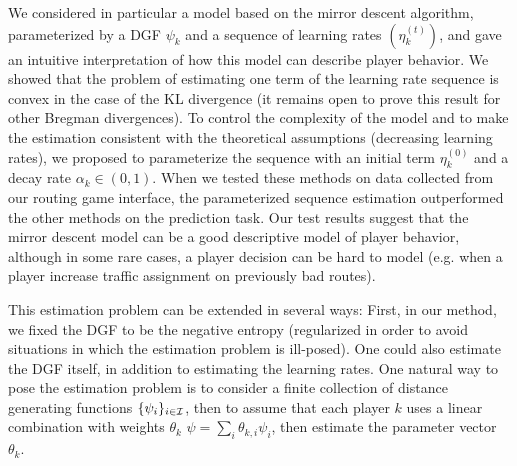 \documentclass{sig-alternate-ipsn13}
\begin{document}
We considered in particular a model based on the mirror descent algorithm, parameterized by a DGF $\psi_k$ and a sequence of learning rates $(\eta^{(t)}_k)$, and gave an intuitive interpretation of how this model can describe player behavior. We showed that the problem of estimating one term of the learning rate sequence is convex in the case of the KL divergence (it remains open to prove this result for other Bregman divergences). To control the complexity of the model and to make the estimation consistent with the theoretical assumptions (decreasing learning rates), we proposed to parameterize the sequence with an initial term $\eta_k^{(0)}$ and a decay rate $\alpha_k \in (0, 1)$. When we tested these methods on data collected from our routing game interface, the parameterized sequence estimation outperformed the other methods on the prediction task. Our test results suggest that the mirror descent model can be a good descriptive model of player behavior, although in some rare cases, a player decision can be hard to model (e.g. when a player increase traffic assignment on previously bad routes).

This estimation problem can be extended in several ways: First, in our method, we fixed the DGF to be the negative entropy (regularized in order to avoid situations in which the estimation problem is ill-posed). One could also estimate the DGF itself, in addition to estimating the learning rates. One natural way to pose the estimation problem is to consider a finite collection of distance generating functions $\{\psi_i\}_{i \in \mathcal{I}}$, then to assume that each player $k$ uses a linear combination with weights $\theta_k$ $\psi = \sum_{i} \theta_{k, i} \psi_i$, then estimate the parameter vector $\theta_k$. 
\newpage
%

%
%

\end{document}
